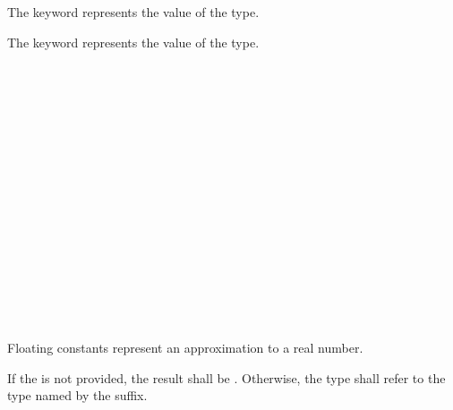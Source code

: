 \specsubsubitem
The  keyword represents the  value of the
 type.

\specsubsubitem
The  keyword represents the  value of the
 type.


\begin{grammar}
 \exactly \\
	     \\
	   \\

 \oneof \\
	 \\

 \exactly \\
	  \\

 \oneof \\
	 \\

 \exactly \\
	   \\

 \oneof \\
        \terminal{+}
        \terminal{-} \\

 \oneof \\
         \\
\end{grammar}

Floating constants represent an approximation to a real number.

\specsubitem
If the  is not provided, the result shall be
. Otherwise, the type shall refer to the type named by the
suffix.

